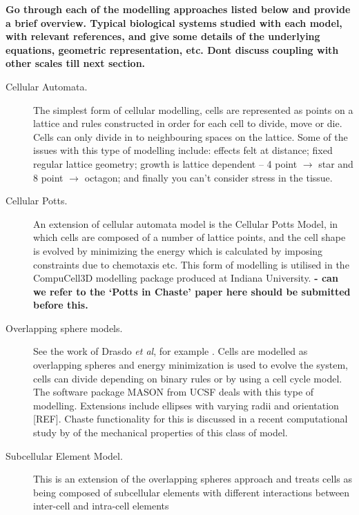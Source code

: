 \documentclass{siamltex}
\newcommand{\highlight}[1]{{\color{red} \bf{#1}}}
\begin{document}
\highlight{Go through each of the modelling approaches listed below and provide a brief overview. 
Typical biological systems studied with each model, with relevant references, and give some details of the underlying equations, geometric representation, etc. Dont discuss coupling with other scales till next section.}

\begin{description}
	\item [Cellular Automata.]
	{The simplest form of cellular modelling, cells are represented as points on a lattice and rules constructed in order for each cell to divide, move or die. 
    Cells can only divide in to neighbouring spaces on the lattice. 
    Some of the issues with this type of modelling include: effects felt at distance; fixed regular lattice geometry; growth is lattice dependent -- 4 point $\rightarrow$ star and 8 point $\rightarrow$ octagon; and finally you can't consider stress in the tissue.}

	\item [Cellular Potts.]
	{An extension of cellular automata model is the Cellular Potts Model, in which cells are composed of a number of lattice points, and the cell shape is evolved by minimizing the energy which is calculated by imposing constraints due to chemotaxis etc. 
	This form of modelling is utilised in the CompuCell3D modelling package produced at Indiana University. 
	\highlight{ - can we refer to the `Potts in Chaste' paper here should be submitted before this.}}

    \item [Overlapping sphere models.]
    {See the work of Drasdo \emph{et al}, for example \citep{Drasdo2007Role}.
    Cells are modelled as overlapping spheres and energy minimization is used to evolve the system, cells can divide depending on binary rules or by using a cell cycle model. 		
    The software package MASON from UCSF deals with this type of modelling. 
    Extensions include ellipses with varying radii and orientation [REF]. 
    Chaste functionality for this is discussed in a recent computational study by \citet{Pathmanathan2009Computational} of the mechanical properties of this class of model.}

    \item [Subcellular Element Model.]
    {This is an extension of the overlapping spheres approach and treats cells as being composed of subcellular elements with different interactions between inter-cell and intra-cell elements \citep{Newman2005Modeling,Sandersius2008Modeling} }


\end{description}
\end{document}
